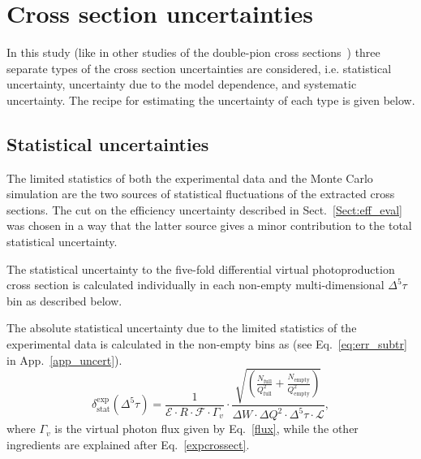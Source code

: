 \chapter{Cross section uncertainties}
\label{Sect:uncert}

In this study (like in other studies of the double-pion cross sections~\cite{Rip_an_note:2002,Ripani:2002ss,Fed_an_note:2007,Fedotov:2008aa,Isupov:2017lnd,Arjun,Fed_an_note:2017,Fed_paper_2018}) three separate types of the cross section uncertainties are considered, i.e. statistical uncertainty, uncertainty due to the model dependence, and systematic uncertainty. The recipe for estimating the uncertainty of each type is given below. 


\section{Statistical uncertainties}
\label{Sect:stat_uncert}


The limited statistics of both the experimental data and the Monte Carlo simulation are the two sources of statistical fluctuations of the extracted 
cross sections. The cut on the efficiency uncertainty described in Sect.~\ref{Sect:eff_eval} was chosen in a way that the latter source gives a minor contribution to the total statistical uncertainty.

The statistical uncertainty to the five-fold differential virtual photoproduction cross section is calculated individually in each non-empty multi-dimensional $\Delta^{5}\tau$ bin as described below.

The absolute statistical  uncertainty due to the limited statistics of the experimental data is calculated in the non-empty bins as (see Eq.~\eqref{eq:err_subtr} in App.~\ref{app_uncert}).%
\begin{equation}
\delta_{\text{stat}}^{\text{exp}}(\Delta^{5} \tau) = \frac{1}{\mathcal{E} \! \cdot \! R \! \cdot \! \mathcal{F} \! \cdot \! \Gamma_{v} }  \cdot  \frac{\sqrt{\left( \frac{N_{\text{full}}}{Q_{\text{full}}^{2}}+\frac{N_{\text{empty}}}{Q_{\text{empty}}^{2}} \right) } }{
\Delta W \! \cdot \!  \Delta Q^{2} \! \cdot \!  \Delta^{5} \tau \! \cdot \! \mathcal{L}},%
\label{staterrors}
\end{equation}
where $\Gamma_{v}$ is the virtual photon flux given by Eq.~\eqref{flux}, while the other ingredients are explained after Eq.~\eqref{expcrossect}.

